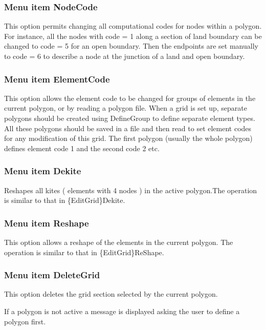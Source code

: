 \documentclass{article}
\begin{document}
\subsubsection[Menu item NodeCode]{Menu item NodeCode}
This option permits changing all computational codes for nodes within a polygon. For instance, all the nodes with code = 1 along a section of land boundary can be changed to code = 5 for an open boundary. Then the endpoints are set manually to code = 6 to describe a node at the junction of a land and open boundary.

\subsubsection[Menu item ElementCode]{Menu item ElementCode}
This option allows the element code to be changed for groups of elements in the current polygon, or by reading a polygon file. When a grid is set up, separate polygons should be created using DefineGroup to define separate element types. All these polygons should be saved in a file and then read to set element codes for any modification of this grid. The first polygon (usually the whole polygon) defines element code 1 and the second code 2 etc.

\subsubsection[Menu item Dekite]{Menu item Dekite}
Reshapes all kites ( elements with 4 nodes ) in the active polygon.The operation is similar to that in \{EditGrid\}Dekite.

\subsubsection[Menu item Reshape]{Menu item Reshape}
This option allows a reshape of the elements in the current polygon. The operation is similar to that in \{EditGrid\}ReShape.

\subsubsection[Menu item DeleteGrid]{Menu item DeleteGrid}
This option deletes the grid section selected by the current polygon.

If a polygon is not active a message is displayed asking the user to define a polygon first.
\end{document}
